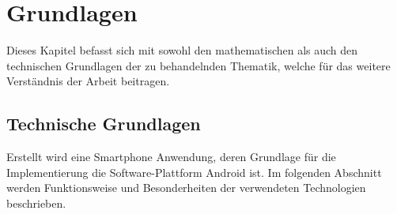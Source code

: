 \chapter{\label{chap:grundlagen}Grundlagen}
Dieses Kapitel befasst sich mit sowohl den mathematischen als auch den technischen Grundlagen der zu behandelnden Thematik, welche für das weitere Verständnis der Arbeit beitragen.
\section{\label{sec:technGrundlagen}Technische Grundlagen}
Erstellt wird eine Smartphone Anwendung, deren Grundlage für die Implementierung die Software-Plattform Android ist. Im folgenden Abschnitt werden Funktionsweise und Besonderheiten der verwendeten Technologien beschrieben. 
